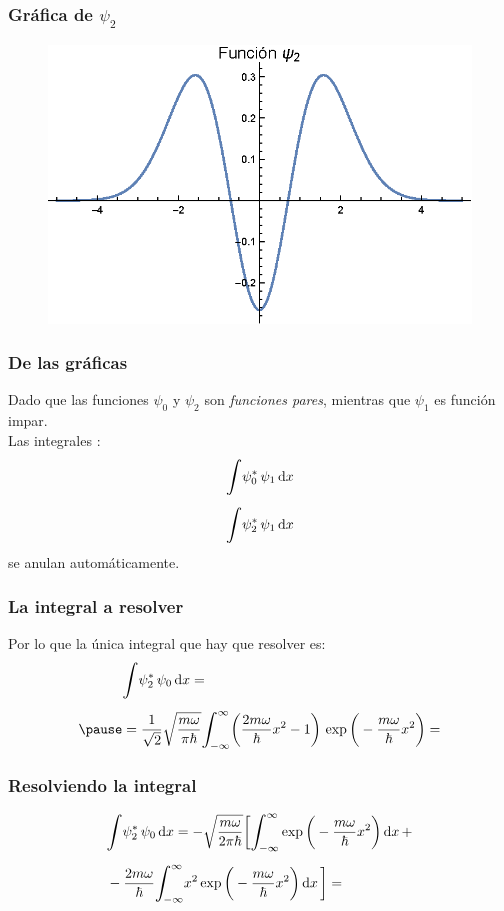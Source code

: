 \documentclass[12pt]{beamer}
\begin{document}
\begin{frame}
\frametitle{Gráfica de $\psi_{2}$}
\begin{figure}
  \centering
  \includegraphics[scale=1]{Imagenes/Plot_Hermite_Psi_2.eps}
\end{figure}
\end{frame}
\begin{frame}
\frametitle{De las gráficas}
Dado que las funciones $\psi_{0}$ y $\psi_{2}$ son \emph{funciones pares}, mientras que $\psi_{1}$ es función impar.
\\
\bigskip
\pause
Las integrales :
\pause
\begin{align*}
\scaleint{6ex} \psi_{0}^{*} \, \psi_{1} \dd{x} \\[0.5em] 
\scaleint{6ex} \psi_{2}^{*} \, \psi_{1} \dd{x} 
\end{align*}
se anulan automáticamente.
\end{frame}
\begin{frame}
\frametitle{La integral a resolver}
Por lo que la única integral que hay que resolver es:
\pause
\begin{eqnarray*}
\begin{aligned}
&\scaleint{6ex} \psi_{2}^{*} \, \psi_{0} \dd{x} = \\[0.5em] \pause
&= \dfrac{1}{\sqrt{2}} \sqrt{\dfrac{m \omega}{\pi \hbar}} \scaleint{6ex}_{\bs -\infty}^{\infty} \bigg( \dfrac{2 m \omega}{\hbar} x^{2} - 1 \bigg) \, \exp\bigg( - \dfrac{m \omega}{\hbar} x^{2} \bigg) =
\end{aligned}
\end{eqnarray*}
\end{frame}
\begin{frame}
\frametitle{Resolviendo la integral}
\begin{align*}
&\scaleint{6ex} \psi_{2}^{*} \, \psi_{0} \dd{x}  = - \sqrt{\dfrac{m \omega}{2 \pi \hbar}} \bigg[ \scaleint{6ex}_{\bs -\infty}^{\infty} \exp\bigg( - \dfrac{m \omega}{\hbar} x^{2} \bigg) \dd{x} + \\[0.5em] 
&- \dfrac{2 m \omega}{\hbar} \scaleint{6ex}_{\bs -\infty}^{\infty} x^{2} \exp\bigg( - \dfrac{m \omega}{\hbar} x^{2} \bigg) \dd{x}  \bigg] =
\end{align*}
\end{frame}
\end{document}
